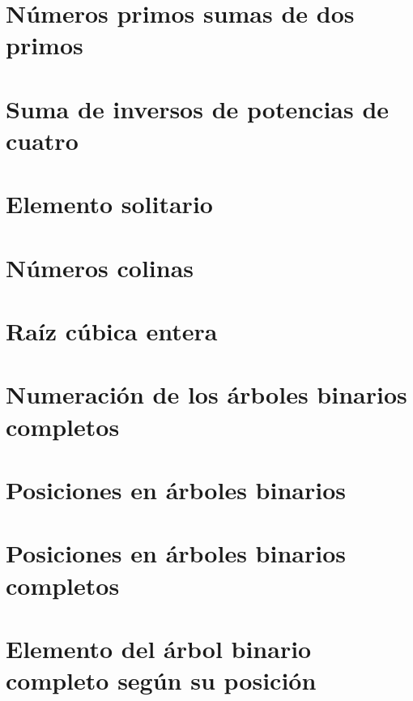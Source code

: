 \documentclass[a4paper,12pt,twoside]{book}
\begin{document}
 
\chapter{Números primos sumas de dos primos}

\chapter{Suma de inversos de potencias de cuatro}

\chapter{Elemento solitario}

\chapter{Números colinas}

\chapter{Raíz cúbica entera}


\chapter{Numeración de los árboles binarios completos}
\label{031218}

\chapter{Posiciones en árboles binarios}
\label{041218}

\chapter{Posiciones en árboles binarios completos}
\label{051218}

\chapter{Elemento del árbol binario completo según su
  posición}
\label{061218}
\end{document}
